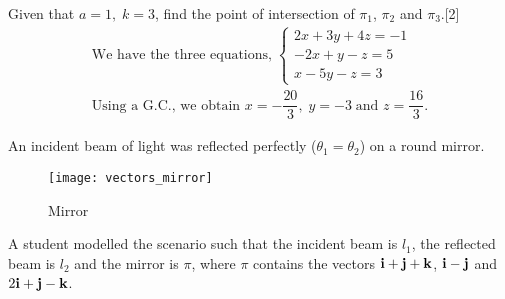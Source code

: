 \documentclass[12pt, a4 paper]{article}
\begin{document}
\begin{outline}[enumerate]
					\color{black}
					\2 Given that $a = 1,\;k = 3$, find the point of intersection of ${\pi _1}$, ${\pi _2}$ and ${\pi _3}$.\hfill[2]
					\color{blue}
					\[\begin{array}{l}{\textrm{We have the three equations,}}\;\left\{ \begin{array}{l}2x + 3y + 4z =  - 1\\ - 2x + y - z = 5\\x - 5y - z = 3\end{array} \right.\\{\textrm{Using a G}}{\textrm{.C}}{\textrm{., we obtain }}x =  - \dfrac{{20}}{3},\;y =  - 3\;{\textrm{and }}z = \dfrac{{16}}{3}.\end{array}\]
					\color{black}

					\1 An incident beam of light was reflected perfectly (${\theta _1} = {\theta _2}$) on a round mirror.

					\begin{figure}[h]
						\centering
						\texttt{[image: vectors\_mirror]}
						\caption{Mirror}
					\end{figure}

					A student modelled the scenario such that the incident beam is ${l_1}$, the reflected beam is ${l_2}$ and the mirror is $\pi $, where $\pi $ contains the vectors ${\bf{i}} + {\bf{j}} + {\bf{k}}$, ${\bf{i}} - {\bf{j}}$ and $2{\bf{i}} + {\bf{j}} - {\bf{k}}$.


\end{outline}
\end{document}
